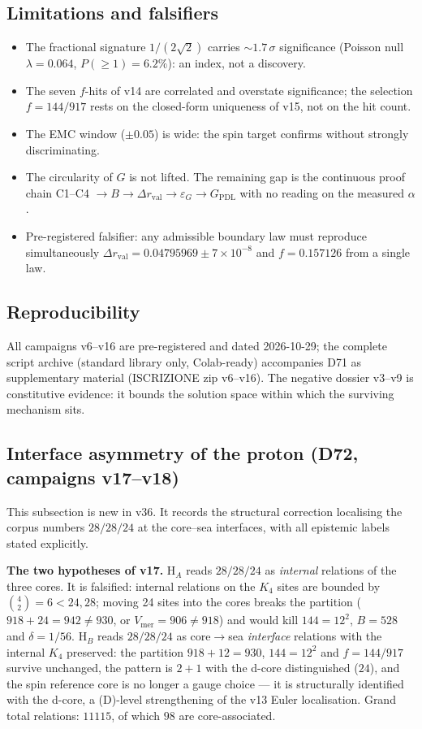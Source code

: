 \documentclass[11pt,a4paper]{article}
\theoremstyle{plain}
\theoremstyle{definition}
\theoremstyle{remark}
\begin{document}
\subsection{Limitations and falsifiers}
\begin{itemize}
\item The fractional signature $1/(2\sqrt{2})$ carries $\sim1.7\,\sigma$ significance (Poisson null $\lambda=0.064$, $P(\geq1)=6.2\%$): an index, not a discovery.
\item The seven $f$-hits of v14 are correlated and overstate significance; the selection $f=144/917$ rests on the closed-form uniqueness of v15, not on the hit count.
\item The EMC window ($\pm0.05$) is wide: the spin target confirms without strongly discriminating.
\item \textcolor{negativered}{The circularity of $G$ is not lifted.} The remaining gap is the continuous proof chain C1--C4 $\to B\to\Delta r_{\mathrm{val}}\to\varepsilon_{G}\to G_{\mathrm{PDL}}$ with no reading on the measured $\alpha$.
\item Pre-registered falsifier: any admissible boundary law must reproduce simultaneously $\Delta r_{\mathrm{val}}=0.04795969\pm7\times10^{-8}$ and $f=0.157126$ from a single law.
\end{itemize}

\subsection{Reproducibility}
All campaigns v6--v16 are pre-registered and dated 2026-10-29; the complete script archive (standard library only, Colab-ready) accompanies D71 as supplementary material (ISCRIZIONE zip v6--v16). The negative dossier v3--v9 is constitutive evidence: it bounds the solution space within which the surviving mechanism sits.

\subsection{Interface asymmetry of the proton (D72, campaigns v17--v18)}
\label{sec:D72}
This subsection is new in v36. It records the structural correction localising the corpus numbers $28/28/24$ at the core--sea interfaces, with all epistemic labels stated explicitly.

\textbf{The two hypotheses of v17.} H$_{A}$ reads $28/28/24$ as \emph{internal} relations of the three cores. It is \textcolor{negativered}{falsified}: internal relations on the $K_{4}$ sites are bounded by $\binom{4}{2}=6<24,28$; moving 24 sites into the cores breaks the partition ($918+24=942\neq930$, or $V_{\mathrm{mer}}=906\neq918$) and would kill $144=12^{2}$, $B=528$ and $\delta=1/56$. H$_{B}$ reads $28/28/24$ as core$\to$sea \emph{interface} relations with the internal $K_{4}$ preserved: the partition $918+12=930$, $144=12^{2}$ and $f=144/917$ survive unchanged, the pattern is $2+1$ with the d-core distinguished ($24$), and the spin reference core is no longer a gauge choice --- it is structurally identified with the d-core, a (D)-level strengthening of the v13 Euler localisation. Grand total relations: $11115$, of which $98$ are core-associated.
\end{document}
